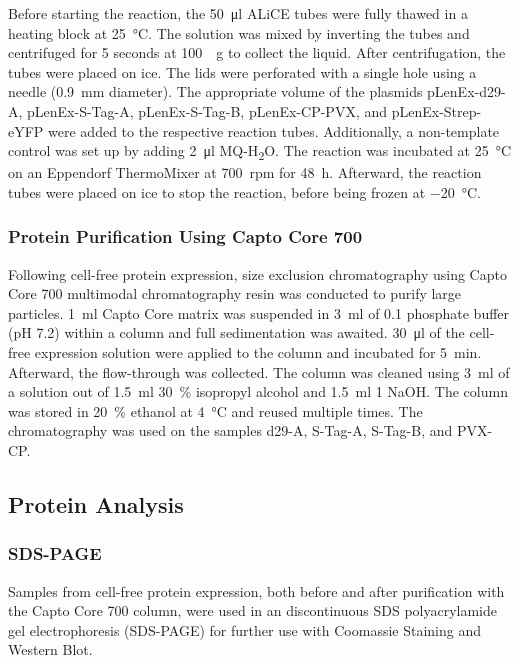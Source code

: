 Before starting the reaction, the \SI{50}{\micro\litre} ALiCE tubes were fully thawed in a heating block at \SI{25}{\degreeCelsius}. The solution was mixed by inverting the tubes and centrifuged for 5 seconds at \SI{100}{\times g} to collect the liquid. After centrifugation, the tubes were placed on ice. The lids were perforated with a single hole using a needle (\SI{0.9}{\milli\meter} diameter). The appropriate volume of the plasmids pLenEx-d29-A, pLenEx-S-Tag-A, pLenEx-S-Tag-B, pLenEx-CP-PVX, and pLenEx-Strep-eYFP were added to the respective reaction tubes. Additionally, a non-template control was set up by adding \SI{2}{\micro\litre} MQ-H\textsubscript{2}O. The reaction was incubated at \SI{25}{\degreeCelsius} on an Eppendorf ThermoMixer at \SI{700}{rpm} for \SI{48}{\hour}. Afterward, the reaction tubes were placed on ice to stop the reaction, before being frozen at \SI{-20}{\degreeCelsius}. 

\subsubsection{Protein Purification Using Capto Core 700}
Following cell-free protein expression, size exclusion chromatography using Capto\textsuperscript{\texttrademark} Core 700 multimodal chromatography resin was conducted to purify large particles. \SI{1}{\milli\litre} Capto\textsuperscript{\texttrademark} Core matrix was suspended in \SI{3}{\milli\litre} of \SI{0.1}{\Molar} phosphate buffer (pH 7.2) within a column and full sedimentation was awaited. \SI{30}{\micro\litre} of the cell-free expression solution were applied to the column and incubated for \SI{5}{\minute}. Afterward, the flow-through was collected. The column was cleaned using \SI{3}{\milli\litre} of a solution out of \SI{1.5}{\milli\litre} \SI{30}{\percent} isopropyl alcohol and \SI{1.5}{\milli\litre} \SI{1}{\Molar} NaOH. The column was stored in \SI{20}{\percent} ethanol at \SI{4}{\degreeCelsius} and reused multiple times. The chromatography was used on the samples d29-A, S-Tag-A, S-Tag-B, and PVX-CP. 

\subsection{Protein Analysis}
\subsubsection{SDS-PAGE}
Samples from cell-free protein expression, both before and after purification with the Capto\textsuperscript{\texttrademark} Core 700 column, were used in an discontinuous SDS polyacrylamide gel electrophoresis (SDS-PAGE) for further use with Coomassie Staining and Western Blot. 

